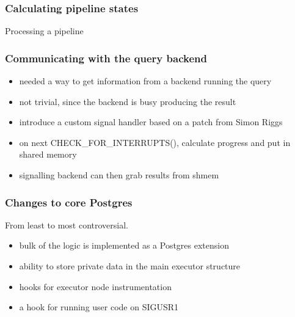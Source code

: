\documentclass{beamer}
\begin{document}
\begin{frame}[fragile]
  \frametitle{Calculating pipeline states}

\begin{block}{Processing a pipeline}
\begin{semiverbatim}
\end{semiverbatim}
\end{block}
\end{frame}

\begin{frame}
  \frametitle{Communicating with the query backend}

  \begin{itemize}
  \item needed a way to get information from a backend running the query
  \item not trivial, since the backend is busy producing the result
  \item introduce a custom signal handler based on a patch from Simon Riggs
  \item on next CHECK\_FOR\_INTERRUPTS(), calculate progress and put in shared
    memory
  \item signalling backend can then grab results from shmem
  \end{itemize}
\end{frame}

\begin{frame}
  \frametitle{Changes to core Postgres}
  From least to most controversial.

  \begin{itemize}
  \item bulk of the logic is implemented as a Postgres extension
  \item ability to store private data in the main executor structure
  \item hooks for executor node instrumentation
  \item a hook for running user code on SIGUSR1
  \end{itemize}
\end{frame}
\end{document}
